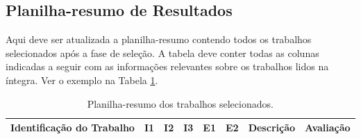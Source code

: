 \documentclass[12pt]{article}
\begin{document}
\pagebreak
\begin{landscape}


    \section{Planilha-resumo de Resultados}

    Aqui deve ser atualizada a planilha-resumo contendo todos os trabalhos selecionados após a fase de seleção. A tabela deve conter todas as colunas indicadas a seguir com as informações relevantes sobre os trabalhos lidos na íntegra. Ver o exemplo na Tabela \ref{tab:resumo}.

    \begin{center}


        \begin{longtable}{p{8cm}|c|c|c|c|c|p{7cm}|p{5cm}}
            \caption{Planilha-resumo dos trabalhos selecionados.}
            \label{tab:resumo}                                                                                                                                                                                                                                                                                                                                                            \\
            \multicolumn{1}{c|}{\textbf{Identificação do Trabalho}} &
            \multicolumn{1}{c|}{\textbf{I1}}                        &
            \multicolumn{1}{c|}{\textbf{I2}}                        &
            \multicolumn{1}{c|}{\textbf{I3}}                        &
            \multicolumn{1}{c|}{\textbf{E1}}                        &
            \multicolumn{1}{c|}{\textbf{E2}}                        &
            \multicolumn{1}{c|}{\textbf{Descrição}}                 & \multicolumn{1}{c}{\textbf{Avaliação}}                                                                                                                                                                                                                                                                              \\ \hline \hline
            \endfirsthead


\end{longtable}
\end{center}
\end{landscape}
\end{document}
